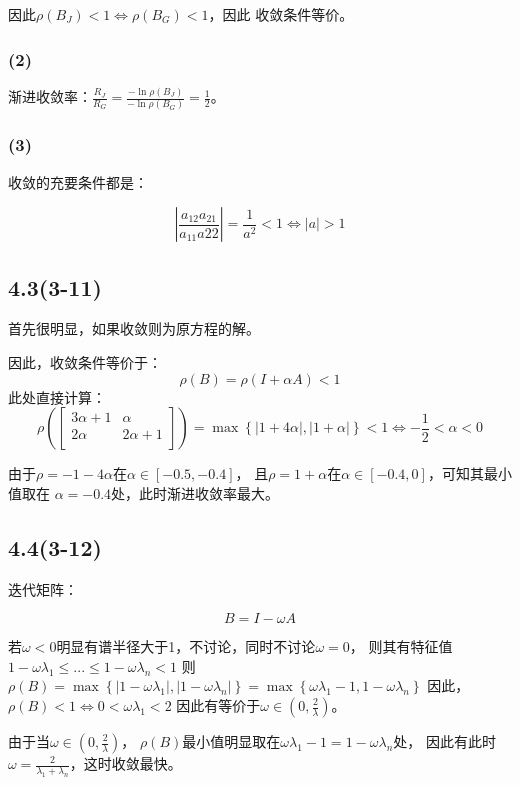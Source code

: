\documentclass[UTF8,zihao=5]{ctexart}
\begin{document}
因此$\rho(B_J)<1\Leftrightarrow\rho(B_G)<1$，因此
收敛条件等价。

\subsubsection*{(2)}

渐进收敛率：$\frac{R_J}{R_G}=\frac{-\ln\rho(B_J)}{-\ln\rho(B_G)}=\frac{1}{2}$。

\subsubsection*{(3)}
收敛的充要条件都是：

$$
    \left|\frac{a_{12}a_{21}}{a_{11}a{22}}\right|
    =\frac{1}{a^2}<1\Leftrightarrow
    |a| >1
$$

\subsection*{4.3(3-11)}

首先很明显，如果收敛则为原方程的解。

因此，收敛条件等价于：
$$
    \rho(B)=\rho(I+\alpha A)<1
$$
此处直接计算：
$$
    \rho\left(
    \begin{bmatrix}
            3\alpha + 1 & \alpha      \\
            2\alpha     & 2\alpha + 1 \\
        \end{bmatrix}
    \right) = \max\left\{
    |1+4\alpha|, |1+\alpha|
    \right\}<1
    \Leftrightarrow
    -\frac{1}{2}<\alpha<0
$$

由于$\rho=-1-4\alpha$在$\alpha\in[-0.5,-0.4]$，
且$\rho=1+\alpha$在$\alpha\in[-0.4,0]$，可知其最小值取在
$\alpha=-0.4$处，此时渐进收敛率最大。


\subsection*{4.4(3-12)}
迭代矩阵：

$$
    B=I-\omega A
$$

若$\omega<0$明显有谱半径大于1，不讨论，同时不讨论$\omega=0$，
则其有特征值$1-\omega\lambda_1\leq ...\leq 1-\omega\lambda_n<1$
则$\rho(B)=\max\left\{|1-\omega\lambda_1|,|1-\omega\lambda_n|\right\}=\max\left\{\omega\lambda_1-1,1-\omega\lambda_n\right\}$
因此，$\rho(B)<1\Leftrightarrow  0<\omega \lambda_1<2$
因此有等价于$\omega\in\left(0,\frac{2}{\lambda}\right)$。

由于当$\omega\in\left(0,\frac{2}{\lambda}\right)$，
$\rho(B)$最小值明显取在$\omega\lambda_1-1=1-\omega\lambda_n$处，
因此有此时$\omega=\frac{2}{\lambda_1+\lambda_n}$，这时收敛最快。
\end{document}
